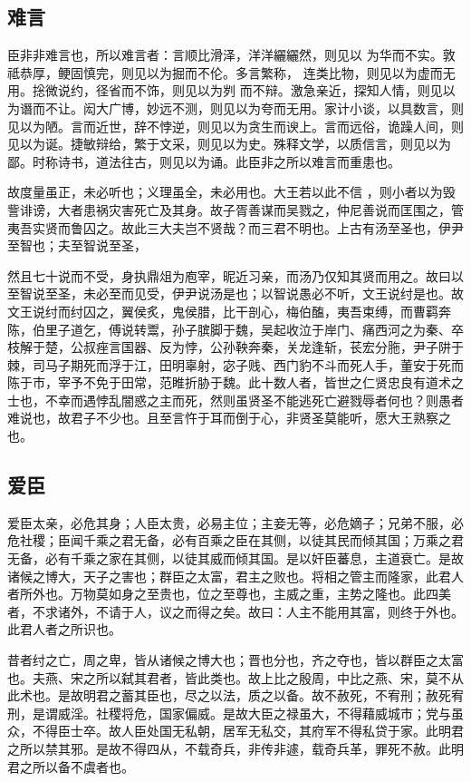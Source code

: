 \documentclass[]{article}
\begin{document}
\hypertarget{header-n828}{%
\subsection{难言}\label{header-n828}}

臣非非难言也，所以难言者：言顺比滑泽，洋洋纚纚然，则见以
为华而不实。敦祗恭厚，鲠固慎完，则见以为掘而不伦。多言繁称，
连类比物，则见以为虚而无用。捴微说约，径省而不饰，则见以为刿
而不辩。激急亲近，探知人情，则见以为谮而不让。闳大广博，妙远不测，则见以为夸而无用。家计小谈，以具数言，则见以为陋。言而近世，辞不悖逆，则见以为贪生而谀上。言而远俗，诡躁人间，则见以为诞。捷敏辩给，繁于文采，则见以为史。殊释文学，以质信言，则见以为鄙。时称诗书，道法往古，则见以为诵。此臣非之所以难言而重患也。

故度量虽正，未必听也；义理虽全，未必用也。大王若以此不信
，则小者以为毁訾诽谤，大者患祸灾害死亡及其身。故子胥善谋而吴戮之，仲尼善说而匡围之，管夷吾实贤而鲁囚之。故此三大夫岂不贤哉？而三君不明也。上古有汤至圣也，伊尹至智也；夫至智说至圣，

然且七十说而不受，身执鼎俎为庖宰，昵近习亲，而汤乃仅知其贤而用之。故曰以至智说至圣，未必至而见受，伊尹说汤是也；以智说愚必不听，文王说纣是也。故文王说纣而纣囚之，翼侯炙，鬼侯腊，比干剖心，梅伯醢，夷吾束缚，而曹羁奔陈，伯里子道乞，傅说转鬻，孙子膑脚于魏，吴起收泣于岸门、痛西河之为秦、卒枝解于楚，公叔痤言国器、反为悖，公孙鞅奔秦，关龙逢斩，苌宏分胣，尹子阱于棘，司马子期死而浮于江，田明辜射，宓子贱、西门豹不斗而死人手，董安于死而陈于市，宰予不免于田常，范睢折胁于魏。此十数人者，皆世之仁贤忠良有道术之士也，不幸而遇悖乱闇惑之主而死，然则虽贤圣不能逃死亡避戮辱者何也？则愚者难说也，故君子不少也。且至言忤于耳而倒于心，非贤圣莫能听，愿大王熟察之也。

\hypertarget{header-n833}{%
\subsection{爱臣}\label{header-n833}}

爱臣太亲，必危其身；人臣太贵，必易主位；主妾无等，必危嫡子；兄弟不服，必危社稷；臣闻千乘之君无备，必有百乘之臣在其侧，以徒其民而倾其国；万乘之君无备，必有千乘之家在其侧，以徒其威而倾其国。是以奸臣蕃息，主道衰亡。是故诸候之博大，天子之害也；群臣之太富，君主之败也。将相之管主而隆家，此君人者所外也。万物莫如身之至贵也，位之至尊也，主威之重，主势之隆也。此四美者，不求诸外，不请于人，议之而得之矣。故曰：人主不能用其富，则终于外也。此君人者之所识也。

昔者纣之亡，周之卑，皆从诸候之博大也；晋也分也，齐之夺也，皆以群臣之太富也。夫燕、宋之所以弑其君者，皆此类也。故上比之殷周，中比之燕、宋，莫不从此术也。是故明君之蓄其臣也，尽之以法，质之以备。故不赦死，不宥刑；赦死宥刑，是谓威淫。社稷将危，国家偏威。是故大臣之禄虽大，不得藉威城市；党与虽众，不得臣士卒。故人臣处国无私朝，居军无私交，其府军不得私贷于家。此明君之所以禁其邪。是故不得四从，不载奇兵，非传非遽，载奇兵革，罪死不赦。此明君之所以备不虞者也。
\end{document}
